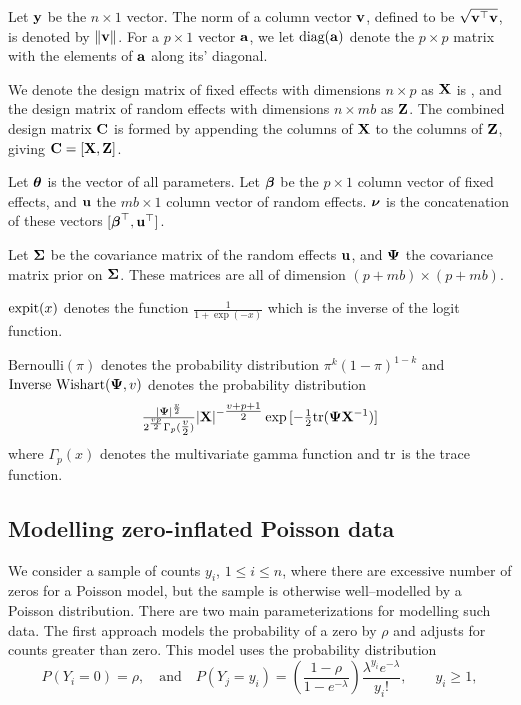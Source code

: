\documentclass{amsart}[12pt]
\begin{document}
Let ${\bf y}$ be the $n \times 1$ vector. The norm of a column vector ${\bf v}$, defined to be $\sqrt{{\bf v}^\top {\bf v}}$,
is  denoted by $\|{\bf v}\|$. For a $p \times 1$ vector ${\bf a}$, we let $\text{diag}{({\bf a})}$ denote the $p \times p$
matrix with the elements of ${\bf a}$ along its' diagonal.

We denote the design matrix of fixed effects with dimensions $n \times p$ as ${\bf X}$ is , and the design matrix
of random  effects with dimensions $n \times m b$ as ${\bf Z}$. The combined design matrix ${\bf C}$ is formed by
appending the columns of ${\bf X}$ to the columns of ${\bf Z}$, giving ${\bf C} = [ {\bf X}, {\bf Z} ]$.

Let ${\boldsymbol \theta}$ is the vector of all parameters.
Let ${\boldsymbol \beta}$ be the $p \times 1$ column vector of fixed
effects, and ${\bf u}$ the $m b \times 1$ column vector of random effects. ${\boldsymbol \nu}$ is the
concatenation of these vectors $[{\boldsymbol \beta}^\top, {\bf u}^\top]$.

Let ${\boldsymbol \Sigma}$ be the covariance matrix of the random effects ${\bf u}$,
and 
${\boldsymbol \Psi}$ the covariance matrix prior on ${\boldsymbol \Sigma}$.
These matrices are all of dimension $(p + m b) \times (p + m b)$.


$\text{expit} (x)$ denotes the function $\tfrac{1}{1 + \exp(-x)}$ which is the inverse of the logit
function.

$\text{Bernoulli}(\pi)$ denotes the probability distribution $\pi^k (1 - \pi)^{1-k}$ and
$\text{Inverse Wishart}({\boldsymbol \Psi}, v)$ denotes the probability distribution
$$\tfrac{|{\boldsymbol \Psi}|^\frac{v}{2}}{2^{\frac{vp}{2}} \Gamma_p{(\tfrac{v}{2})}} |{\bf X}|^{-\tfrac{v + p + 1}{2}}
\exp{[- \tfrac{1}{2} \text{tr}{({\boldsymbol\Psi}{\bf X}^{-1})}]}$$ where $\Gamma_p{(x)}$ denotes the multivariate gamma function and $\text{tr}$
is the trace function.

\subsection{Modelling zero-inflated Poisson data}

We consider a sample of counts $y_i$, $1 \le i\le n$, where there are excessive number of zeros for a Poisson
model, but the sample is otherwise well--modelled by a Poisson distribution. There are two main
parameterizations for modelling such data. The first approach models the probability of a zero by $\rho$ and
adjusts for counts greater than zero. This model uses the probability distribution
\[
	P(Y_i = 0) = \rho, 
	\quad \mbox{and} \quad 
	P(Y_j = y_i) = \left( \frac{1 - \rho}{1 - e^{-\lambda}} \right) \frac{\lambda^{y_i} e^{-\lambda}} {y_i!},\qquad y_i \ge 1,
\]
\end{document}
